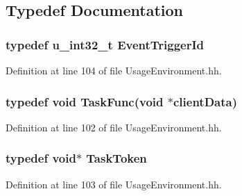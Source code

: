 \subsection{Typedef Documentation}
\subsubsection[{Event\+Trigger\+Id}]{\setlength{\rightskip}{0pt plus 5cm}typedef u\+\_\+int32\+\_\+t {\bf Event\+Trigger\+Id}}\label{UsageEnvironment_8hh_a4fbac7ceb1bb8dcc001e9a67819f7f0b}


Definition at line 104 of file Usage\+Environment.\+hh.

\subsubsection[{Task\+Func}]{\setlength{\rightskip}{0pt plus 5cm}typedef void Task\+Func(void $\ast$client\+Data)}\label{UsageEnvironment_8hh_a122b82211e36f2adb753887563e73f42}


Definition at line 102 of file Usage\+Environment.\+hh.

\subsubsection[{Task\+Token}]{\setlength{\rightskip}{0pt plus 5cm}typedef void$\ast$ {\bf Task\+Token}}\label{UsageEnvironment_8hh_a6f3929d6239417925d54c4e1d5165327}


Definition at line 103 of file Usage\+Environment.\+hh.

